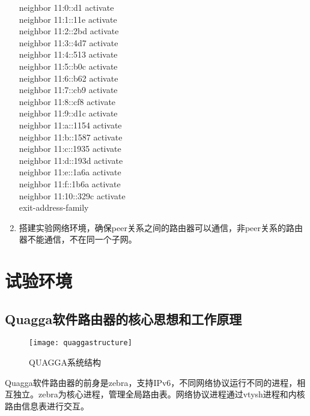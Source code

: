 \begin{enumerate}
     neighbor 11:0::d1  activate\\
     neighbor 11:1::11e  activate\\
     neighbor 11:2::2bd  activate\\
     neighbor 11:3::4d7  activate\\
     neighbor 11:4::513  activate\\
     neighbor 11:5::b0c  activate\\
     neighbor 11:6::b62  activate\\
     neighbor 11:7::cb9  activate\\
     neighbor 11:8::cf8  activate\\
     neighbor 11:9::d1c  activate\\
     neighbor 11:a::1154  activate\\
     neighbor 11:b::1587  activate\\
     neighbor 11:c::1935  activate\\
     neighbor 11:d::193d  activate\\
     neighbor 11:e::1a6a  activate\\
     neighbor 11:f::1b6a  activate\\
     neighbor 11:10::329c  activate\\
     exit-address-family
\item  搭建实验网络环境，确保peer关系之间的路由器可以通信，非peer关系的路由器不能通信，不在同一个子网。
\end{enumerate}

\section{试验环境}

\subsection{Quagga软件路由器的核心思想和工作原理}


\begin{figure}
  \centering
  \texttt{[image: quaggastructure]}\\
  \caption{QUAGGA系统结构}\label{fig:quaggastructure}
\end{figure}

Quagga\cite{quagga}软件路由器的前身是zebra，支持IPv6，不同网络协议运行不同的进程，相互独立。zebra为核心进程，管理全局路由表。网络协议进程通过vtysh进程和内核路由信息表进行交互。

